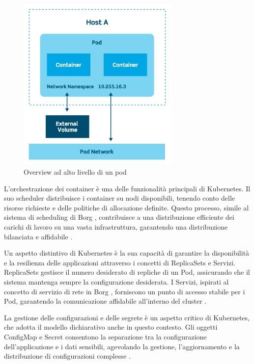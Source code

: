 \begin{figure}[h]
    \centering
    \includegraphics[width=300px]{figures/ch3/kube-pod.jpg}
    \caption[Overview ad alto livello di un pod]{Overview ad alto livello di un pod}
    \label{fig:cha3:k8s2}
\end{figure}

L'orchestrazione dei container è una delle funzionalità principali di Kubernetes. Il suo scheduler distribuisce i container su nodi disponibili, tenendo conto delle risorse richieste e delle politiche di allocazione definite. Questo processo, simile al sistema di scheduling di Borg \cite{burns2016borg}, contribuisce a una distribuzione efficiente dei carichi di lavoro su una vasta infrastruttura, garantendo una distribuzione bilanciata e affidabile \cite{burns2016borg}.

Un aspetto distintivo di Kubernetes è la sua capacità di garantire la disponibilità e la resilienza delle applicazioni attraverso i concetti di ReplicaSets e Servizi. ReplicaSets gestisce il numero desiderato di repliche di un Pod, assicurando che il sistema mantenga sempre la configurazione desiderata. I Servizi, ispirati al concetto di servizio di rete in Borg \cite{verma2015large}, forniscono un punto di accesso stabile per i Pod, garantendo la comunicazione affidabile all'interno del cluster \cite{burns2016borg}.

La gestione delle configurazioni e delle segrete è un aspetto critico di Kubernetes, che adotta il modello dichiarativo anche in questo contesto. Gli oggetti ConfigMap e Secret consentono la separazione tra la configurazione dell'applicazione e i dati sensibili, agevolando la gestione, l'aggiornamento e la distribuzione di configurazioni complesse \cite{hightower2017kubernetes}.

